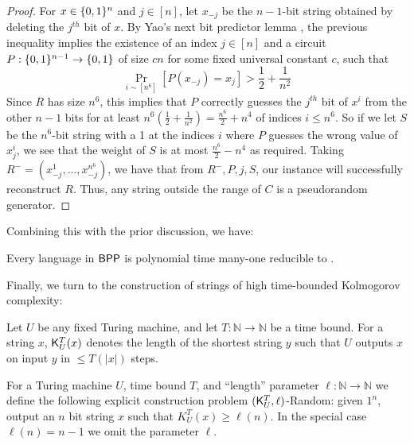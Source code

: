 \begin{proof}
For $x \in \{0,1\}^n$ and $j \in [n]$, let $x_{-j}$ be the $n-1$-bit string obtained by deleting the $j^{th}$ bit of $x$. By Yao's next bit predictor lemma \cite{Yao} \cite{Vadhan}, the previous inequality implies the existence of an index $j \in [n]$ and a circuit $P: \{0,1\}^{n-1} \rightarrow \{0,1\}$ of size $cn$ for some fixed universal constant $c$, such that
\[
\Pr_{i \sim [n^6]}[P(x_{-j}) = x_j] > \frac{1}{2} + \frac{1}{n^2}
\]
Since $R$ has size $n^6$, this implies that $P$ correctly guesses the $j^{th}$ bit of $x^i$ from the other $n-1$ bits for at least $n^6(\frac{1}{2} + \frac{1}{n^2}) = \frac{n^6}{2} + n^4$ of indices $i \leq n^6$. So if we let $S$ be the $n^6$-bit string with a 1 at the indices $i$ where $P$ guesses the wrong value of $x^i_j$, we see that the weight of $S$ is at most $\frac{n^6}{2} - n^4$ as required. Taking $R^- = (x^1_{-j}, \ldots, x^{n^6}_{-j})$, we have that from $R^-,P,j,S$, our \avoid instance will successfully reconstruct $R$. Thus, any string outside the range of $C$ is a pseudorandom generator.
\end{proof}

Combining this with the prior discussion, we have:
\begin{corollary}\label{cor:avoid-bpp}
Every language in $\cl{BPP}$ is polynomial time many-one reducible to \avoid.
\end{corollary}

Finally, we turn to the construction of strings of high time-bounded Kolmogorov complexity:
\begin{definition}\label{range:def:kt-random-problem}
Let $U$ be any fixed Turing machine, and let $T: \mathbb{N} \rightarrow \mathbb{N}$ be a time bound. For a string $x$, $\cl{K}_U^T(x)$ denotes the length of the shortest string $y$ such that $U$ outputs $x$ on input $y$ in $\leq T(|x|)$ steps. 

For a Turing machine $U$, time bound $T$, and ``length'' parameter $\ell: \mathbb{N} \to \mathbb{N}$ we define the following explicit construction problem {\sc $(\cl{K}^T_U, \ell)$-Random}: given $1^n$, output an $n$ bit string $x$ such that $K_U^T(x) \geq \ell(n)$. In the special case $\ell(n) = n-1$ we omit the parameter $\ell$.
\end{definition}


